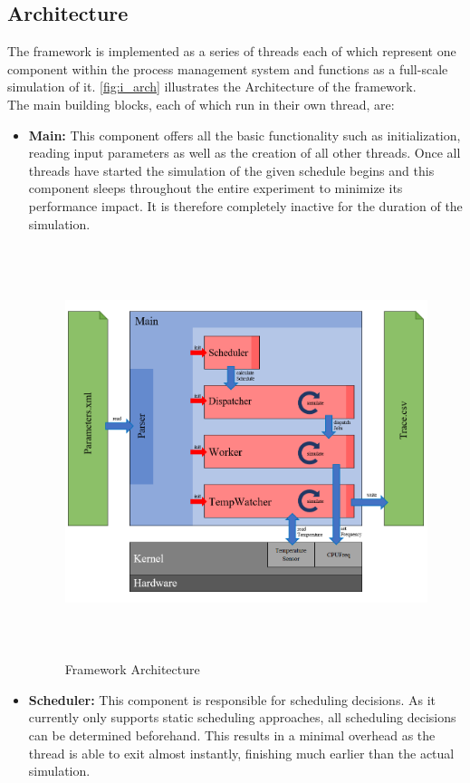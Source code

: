 \subsection{Architecture}
The framework is implemented as a series of threads each of which represent one component within the process management system and functions as a full-scale simulation of it. \autoref{fig:i_arch} illustrates the Architecture of the framework.\\
The main building blocks, each of which run in their own thread, are: 
\begin{itemize}
\item \textbf{Main:} This component offers all the basic functionality such as initialization, reading input parameters as well as the creation of all other threads. Once all threads have started the simulation of the given schedule begins and this component sleeps throughout the entire experiment to minimize its performance impact. It is therefore completely inactive for the duration of the simulation.\\
\begin{figure}[H]
  \centering
  \includegraphics[height=12cm]{figures/arch}
  \caption[Architecture]{Framework Architecture}\label{fig:i_arch}
\end{figure}
\item \textbf{Scheduler:} This component is responsible for scheduling decisions. As it currently only supports static scheduling approaches, all scheduling decisions can be determined beforehand. This results in a minimal overhead as the thread is able to exit almost instantly, finishing much earlier than the actual simulation.

\end{itemize}
